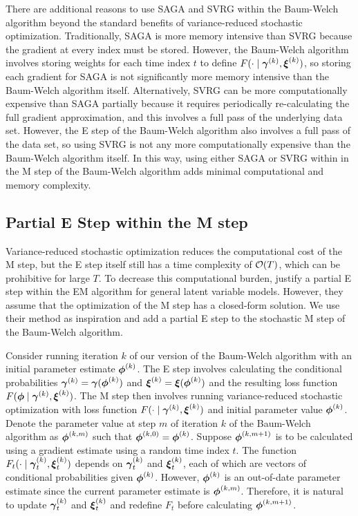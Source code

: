There are additional reasons to use SAGA and SVRG within the Baum-Welch algorithm beyond the standard benefits of variance-reduced stochastic optimization. Traditionally, SAGA is more memory intensive than SVRG because the gradient at every index must be stored. However, the Baum-Welch algorithm involves storing weights for each time index $t$ to define $F(\cdot \mid \boldsymbol{\gamma}^{(k)}, \boldsymbol{\xi}^{(k)})$, so storing each gradient for SAGA is not significantly more memory intensive than the Baum-Welch algorithm itself. Alternatively, SVRG can be more computationally expensive than SAGA partially because it requires periodically re-calculating the full gradient approximation, and this involves a full pass of the underlying data set. However, the E step of the Baum-Welch algorithm also involves a full pass of the data set, so using SVRG is not any more computationally expensive than the Baum-Welch algorithm itself. In this way, using either SAGA or SVRG within in the M step of the Baum-Welch algorithm adds minimal computational and memory complexity.

\subsection{Partial E Step within the M step}
\label{subsec:stoch_E}

Variance-reduced stochastic optimization reduces the computational cost of the M step, but the E step itself still has a time complexity of $\mathcal{O}(T)$, which can be prohibitive for large $T$. To decrease this computational burden, \citet{Neal:1998} justify a partial E step within the EM algorithm for general latent variable models. However, they assume that the optimization of the M step has a closed-form solution. We use their method as inspiration and add a partial E step to the stochastic M step of the Baum-Welch algorithm. 

Consider running iteration $k$ of our version of the Baum-Welch algorithm with an initial parameter estimate $\boldsymbol{\phi}^{(k)}$. The E step involves calculating the conditional probabilities $\boldsymbol{\gamma}^{(k)} = \boldsymbol{\gamma}(\boldsymbol{\phi}^{(k)})$ and $\boldsymbol{\xi}^{(k)} = \boldsymbol{\xi}(\boldsymbol{\phi}^{(k)})$ and the resulting loss function $F(\boldsymbol{\phi} \mid \boldsymbol{\gamma}^{(k)},\boldsymbol{\xi}^{(k)})$. The M step then involves running variance-reduced stochastic optimization with loss function $F(\cdot \mid \boldsymbol{\gamma}^{(k)},\boldsymbol{\xi}^{(k)})$ and initial parameter value $\boldsymbol{\phi}^{(k)}$. Denote the parameter value at step $m$ of iteration $k$ of the Baum-Welch algorithm as $\boldsymbol{\phi}^{(k,m)}$ such that $\boldsymbol{\phi}^{(k,0)} = \boldsymbol{\phi}^{(k)}$. Suppose $\boldsymbol{\phi}^{(k,m+1)}$ is to be calculated using a gradient estimate using a random time index $t$. The function $F_{t}(\cdot \mid \boldsymbol{\gamma}_{t}^{(k)},\boldsymbol{\xi}_{t}^{(k)})$ depends on $\boldsymbol{\gamma}_{t}^{(k)}$ and $\boldsymbol{\xi}_{t}^{(k)}$, each of which are vectors of conditional probabilities given $\boldsymbol{\phi}^{(k)}$. However, $\boldsymbol{\phi}^{(k)}$ is an out-of-date parameter estimate since the current parameter estimate is $\boldsymbol{\phi}^{(k,m)}$. Therefore, it is natural to update $\boldsymbol{\gamma}_{t}^{(k)}$ and $\boldsymbol{\xi}_{t}^{(k)}$ and redefine $F_{t}$ before calculating $\boldsymbol{\phi}^{(k,m+1)}$. 

